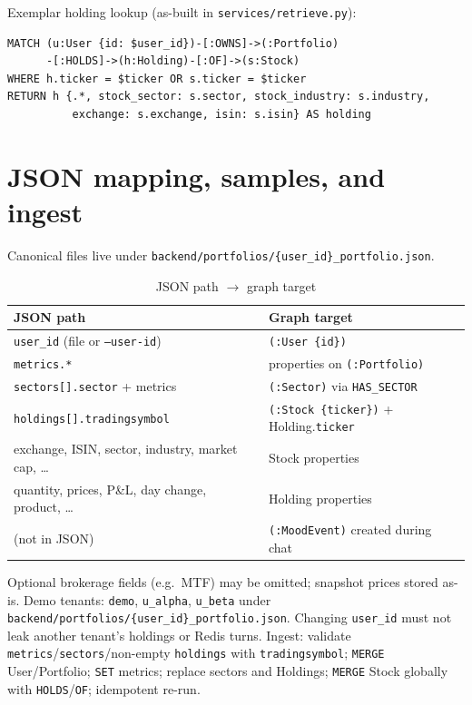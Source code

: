 \noindent
Exemplar holding lookup (as-built in \texttt{services/retrieve.py}):

\begin{verbatim}
MATCH (u:User {id: $user_id})-[:OWNS]->(:Portfolio)
      -[:HOLDS]->(h:Holding)-[:OF]->(s:Stock)
WHERE h.ticker = $ticker OR s.ticker = $ticker
RETURN h {.*, stock_sector: s.sector, stock_industry: s.industry,
          exchange: s.exchange, isin: s.isin} AS holding
\end{verbatim}

\section{JSON mapping, samples, and ingest}

Canonical files live under \texttt{backend/portfolios/\{user\_id\}\_portfolio.json}.

\begin{table}[!htbp]
\centering
\small
\caption{JSON path $\rightarrow$ graph target}
\label{tab:json-map}
\begin{tabularx}{\textwidth}{@{}
  >{\raggedright\arraybackslash}p{}
  >{\raggedright\arraybackslash}X
  @{}}
\toprule
\textbf{JSON path} & \textbf{Graph target} \\
\midrule
\texttt{user\_id} (file or \texttt{--user-id}) & \texttt{(:User \{id\})} \\
\addlinespace
\texttt{metrics.*} & properties on \texttt{(:Portfolio)} \\
\addlinespace
\texttt{sectors[].sector} + metrics & \texttt{(:Sector)} via \texttt{HAS\_SECTOR} \\
\addlinespace
\texttt{holdings[].tradingsymbol} & \texttt{(:Stock \{ticker\})} + Holding.\texttt{ticker} \\
\addlinespace
exchange, ISIN, sector, industry, market cap, \ldots & Stock properties \\
\addlinespace
quantity, prices, P\&L, day change, product, \ldots & Holding properties \\
\addlinespace
(not in JSON) & \texttt{(:MoodEvent)} created during chat \\
\bottomrule
\end{tabularx}
\end{table}

\noindent
Optional brokerage fields (e.g.\ MTF) may be omitted; snapshot prices stored as-is. Demo tenants: \texttt{demo}, \texttt{u\_alpha}, \texttt{u\_beta} under \texttt{backend/portfolios/\{user\_id\}\_portfolio.json}. Changing \texttt{user\_id} must not leak another tenant's holdings or Redis turns. Ingest: validate \texttt{metrics}/\texttt{sectors}/non-empty \texttt{holdings} with \texttt{tradingsymbol}; \texttt{MERGE} User/Portfolio; \texttt{SET} metrics; replace sectors and Holdings; \texttt{MERGE} Stock globally with \texttt{HOLDS}/\texttt{OF}; idempotent re-run.

